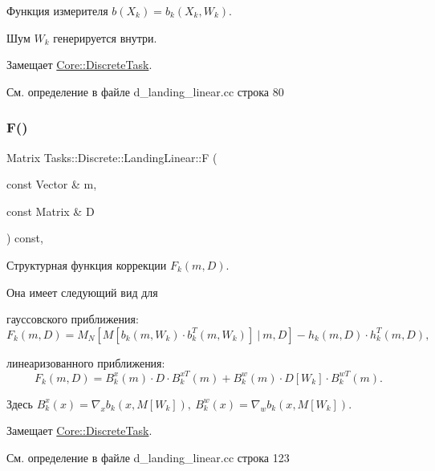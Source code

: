 Функция измерителя $b(X_k) = b_k(X_k, W_k)$. 

Шум $W_k$ генерируется внутри. 

Замещает \hyperlink{class_core_1_1_discrete_task_a82c1aa8100dd9211739f8fd9f7d52c81}{Core\+::\+Discrete\+Task}.



См. определение в файле d\+\_\+landing\+\_\+linear.\+cc строка 80

\hypertarget{class_tasks_1_1_discrete_1_1_landing_linear_abb4e2b054240cf909f0128721237334c}{}\label{class_tasks_1_1_discrete_1_1_landing_linear_abb4e2b054240cf909f0128721237334c} 
\subsubsection{\texorpdfstring{F()}{F()}}
{\footnotesize\ttfamily Matrix Tasks\+::\+Discrete\+::\+Landing\+Linear\+::F (\begin{DoxyParamCaption}\item[{const Vector \&}]{m,  }\item[{const Matrix \&}]{D }\end{DoxyParamCaption}) const\hspace{0.3cm}{\ttfamily [override]}, {\ttfamily [virtual]}}



Структурная функция коррекции $F_k(m, D)$. 

Она имеет следующий вид для


\begin{DoxyItemize}
\item гауссовского приближения\+: \[F_k(m, D) = M_N[M[b_k(m, W_k)\cdot b_k^T(m, W_k)] \ |\ m, D] - h_k(m,D) \cdot h_k^T(m, D),\]
\item линеаризованного приближения\+: \[F_k(m, D) = B_k^x(m) \cdot D \cdot B_k^{xT}(m) + B_k^w(m) \cdot D[W_k] \cdot B_k^{wT}(m).\]
\end{DoxyItemize}

Здесь $B_k^x(x) = \nabla_x b_k(x, M[W_k]),\ B_k^w(x) = \nabla_w b_k(x, M[W_k])$. 

Замещает \hyperlink{class_core_1_1_discrete_task_ac55ca2cd47f0c9f7e5d3d3704becee46}{Core\+::\+Discrete\+Task}.



См. определение в файле d\+\_\+landing\+\_\+linear.\+cc строка 123


